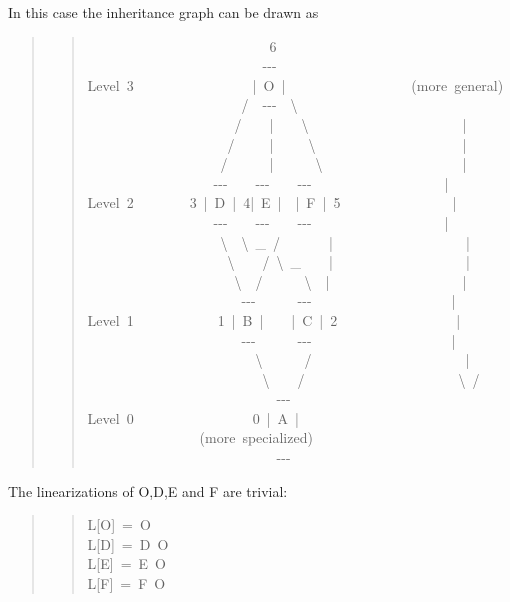 \documentclass[10pt,a4paper,english]{article}
\begin{document}
In this case the inheritance graph can be drawn as
\begin{quote}
\begin{quote}{\ttfamily \raggedright \noindent
~~~~~~~~~~~~~~~~~~~~~~~~~~6~\\
~~~~~~~~~~~~~~~~~~~~~~~~~-{}-{}-~\\
Level~3~~~~~~~~~~~~~~~~~|~O~|~~~~~~~~~~~~~~~~~~(more~general)~\\
~~~~~~~~~~~~~~~~~~~~~~/~~-{}-{}-~~{\textbackslash}~\\
~~~~~~~~~~~~~~~~~~~~~/~~~~|~~~~{\textbackslash}~~~~~~~~~~~~~~~~~~~~~~|~\\
~~~~~~~~~~~~~~~~~~~~/~~~~~|~~~~~{\textbackslash}~~~~~~~~~~~~~~~~~~~~~|~\\
~~~~~~~~~~~~~~~~~~~/~~~~~~|~~~~~~{\textbackslash}~~~~~~~~~~~~~~~~~~~~|~\\
~~~~~~~~~~~~~~~~~~-{}-{}-~~~~-{}-{}-~~~~-{}-{}-~~~~~~~~~~~~~~~~~~~|~\\
Level~2~~~~~~~~3~|~D~|~4|~E~|~~|~F~|~5~~~~~~~~~~~~~~~~|~\\
~~~~~~~~~~~~~~~~~~-{}-{}-~~~~-{}-{}-~~~~-{}-{}-~~~~~~~~~~~~~~~~~~~|~\\
~~~~~~~~~~~~~~~~~~~{\textbackslash}~~{\textbackslash}~{\_}~/~~~~~~~|~~~~~~~~~~~~~~~~~~~|~\\
~~~~~~~~~~~~~~~~~~~~{\textbackslash}~~~~/~{\textbackslash}~{\_}~~~~|~~~~~~~~~~~~~~~~~~~|~\\
~~~~~~~~~~~~~~~~~~~~~{\textbackslash}~~/~~~~~~{\textbackslash}~~|~~~~~~~~~~~~~~~~~~~|~\\
~~~~~~~~~~~~~~~~~~~~~~-{}-{}-~~~~~~-{}-{}-~~~~~~~~~~~~~~~~~~~~|~\\
Level~1~~~~~~~~~~~~1~|~B~|~~~~|~C~|~2~~~~~~~~~~~~~~~~~|~\\
~~~~~~~~~~~~~~~~~~~~~~-{}-{}-~~~~~~-{}-{}-~~~~~~~~~~~~~~~~~~~~|~\\
~~~~~~~~~~~~~~~~~~~~~~~~{\textbackslash}~~~~~~/~~~~~~~~~~~~~~~~~~~~~~|~\\
~~~~~~~~~~~~~~~~~~~~~~~~~{\textbackslash}~~~~/~~~~~~~~~~~~~~~~~~~~~~{\textbackslash}~/~\\
~~~~~~~~~~~~~~~~~~~~~~~~~~~-{}-{}-~\\
Level~0~~~~~~~~~~~~~~~~~0~|~A~|~~~~~~~~~~~~~~~~(more~specialized)~\\
~~~~~~~~~~~~~~~~~~~~~~~~~~~-{}-{}-
}\end{quote}
\end{quote}

The linearizations of O,D,E and F are trivial:
\begin{quote}
\begin{quote}{\ttfamily \raggedright \noindent
L{[}O]~=~O~\\
L{[}D]~=~D~O~\\
L{[}E]~=~E~O~\\
L{[}F]~=~F~O
}\end{quote}
\end{quote}
\end{document}
